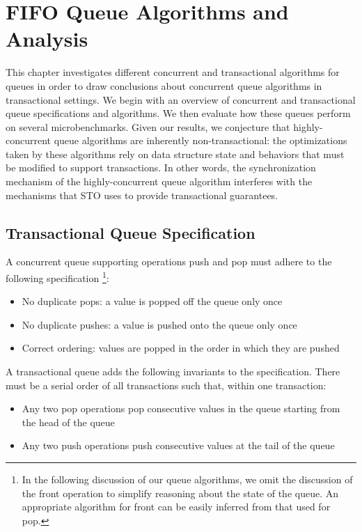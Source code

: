 \chapter{FIFO Queue Algorithms and Analysis}
\label{queue}

This chapter investigates different concurrent and transactional algorithms for queues in order to draw conclusions about concurrent queue algorithms in transactional settings. We begin with an overview of concurrent and transactional queue specifications and algorithms. We then evaluate how these queues perform on several microbenchmarks. Given our results, we conjecture that highly-concurrent queue algorithms are inherently non-transactional: the optimizations taken by these algorithms rely on data structure state and behaviors that must be modified to support transactions. In other words, the synchronization mechanism of the highly-concurrent queue algorithm interferes with the mechanisms that STO uses to provide transactional guarantees.

\section{Transactional Queue Specification}

A concurrent queue supporting operations push and pop must adhere to the following specification%
\footnote{In the following discussion of our queue algorithms, we omit the discussion of the front operation to simplify reasoning about the state of the queue. An appropriate algorithm for front can be easily inferred from that used for pop.}:
\begin{itemize}
    \item No duplicate pops: a value is popped off the queue only once
    \item No duplicate pushes: a value is pushed onto the queue only once
    \item Correct ordering: values are popped in the order in which they are pushed
\end{itemize}

\noindent
A transactional queue adds the following invariants to the specification. There must be a serial order of all transactions such that, within one transaction:
\begin{itemize}
    \item Any two pop operations pop consecutive values in the queue starting from the head of the queue
    \item Any two push operations push consecutive values at the tail of the queue
\end{itemize}

